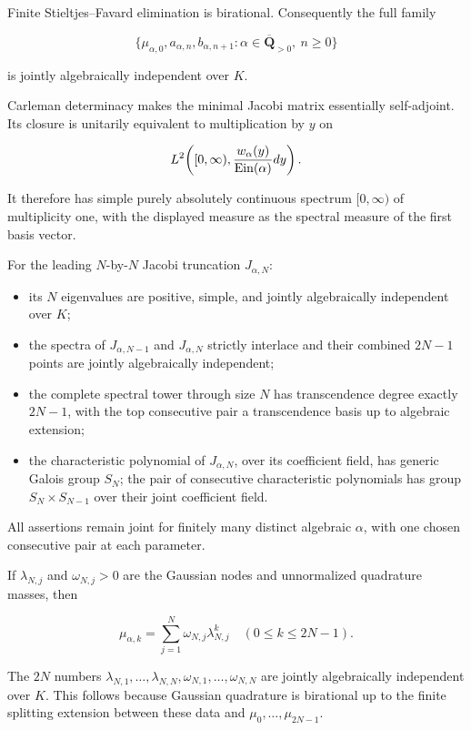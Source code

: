 Finite Stieltjes--Favard elimination is birational. Consequently the full
family

\[
\{\mu_{\alpha,0},a_{\alpha,n},b_{\alpha,n+1}:
\alpha\in\overline{\mathbf Q}_{>0},\ n\ge0\}
\]

is jointly algebraically independent over \(K\).

Carleman determinacy makes the minimal Jacobi matrix essentially
self-adjoint. Its closure is unitarily equivalent to multiplication by \(y\)
on

\[
L^2\!\left([0,\infty),\frac{w_\alpha(y)}{\operatorname{Ein}(\alpha)}dy\right).
\]

It therefore has simple purely absolutely continuous spectrum \([0,\infty)\)
of multiplicity one, with the displayed measure as the spectral measure of
the first basis vector.

For the leading \(N\)-by-\(N\) Jacobi truncation \(J_{\alpha,N}\):

\begin{itemize}
\tightlist
\item
  its \(N\) eigenvalues are positive, simple, and jointly algebraically
  independent over \(K\);
\item
  the spectra of \(J_{\alpha,N-1}\) and \(J_{\alpha,N}\) strictly interlace
  and their combined \(2N-1\) points are jointly algebraically independent;
\item
  the complete spectral tower through size \(N\) has transcendence degree
  exactly \(2N-1\), with the top consecutive pair a transcendence basis up
  to algebraic extension;
\item
  the characteristic polynomial of \(J_{\alpha,N}\), over its coefficient
  field, has generic Galois group \(S_N\); the pair of consecutive
  characteristic polynomials has group \(S_N\times S_{N-1}\) over their
  joint coefficient field.
\end{itemize}

All assertions remain joint for finitely many distinct algebraic \(\alpha\),
with one chosen consecutive pair at each parameter.

If \(\lambda_{N,j}\) and \(\omega_{N,j}>0\) are the Gaussian nodes and
unnormalized quadrature masses, then

\[
\mu_{\alpha,k}=\sum_{j=1}^N\omega_{N,j}\lambda_{N,j}^k
\quad(0\le k\le2N-1).
\]

The \(2N\) numbers \(\lambda_{N,1},\ldots,\lambda_{N,N}, \omega_{N,1},\ldots,\omega_{N,N}\) are jointly algebraically independent
over \(K\). This follows because Gaussian quadrature is birational up to the
finite splitting extension between these data and
\(\mu_0,\ldots,\mu_{2N-1}\).

